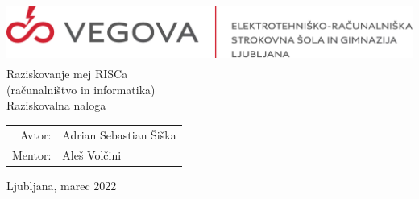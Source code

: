 \documentclass[12pt]{article}
\begin{document}
\linespread{1.25}
\begin{titlepage}
  \begin{center}
    \includegraphics[height=2cm]{slike/vegova.png}\\
    \Huge
    \vspace*{6cm}
    Raziskovanje mej RISCa\\
    \Large
    (računalništvo in informatika)\\
    Raziskovalna naloga\\
  \end{center}
  \vspace{8cm}
  \begin{tabular}{rl}
Avtor: & Adrian Sebastian Šiška\\
Mentor: & Aleš Volčini
    \end{tabular}
    \vspace{1cm}
    \begin{center}
      Ljubljana, marec 2022
    \end{center}
\end{titlepage}

\pagebreak
{}

\tableofcontents

\pagebreak

\listoffigures

\pagebreak

%
%

\end{document}
